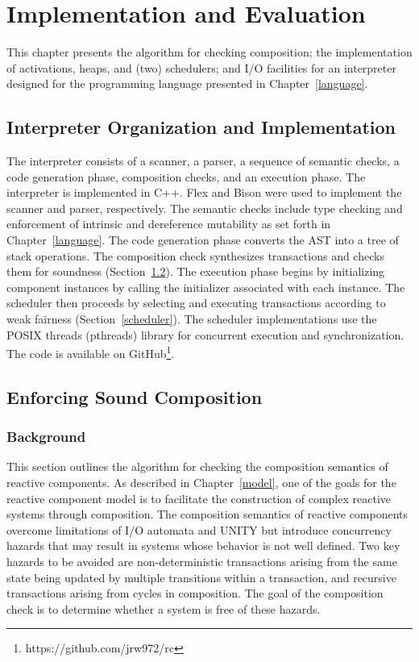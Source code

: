 \chapter{Implementation and Evaluation}
\label{implementation}

This chapter presents the algorithm for checking composition; the implementation of activations, heaps, and (two) schedulers; and I/O facilities for an interpreter designed for the \rcgo programming language presented in Chapter~\ref{language}.

\section{Interpreter Organization and Implementation}
\label{interpreter}

The interpreter consists of a scanner, a parser, a sequence of semantic checks, a code generation phase, composition checks, and an execution phase.
The interpreter is implemented in C++.
Flex and Bison were used to implement the scanner and parser, respectively.
The semantic checks include type checking and enforcement of intrinsic and dereference mutability as set forth in Chapter~\ref{language}.
The code generation phase converts the AST into a tree of stack operations.
The composition check synthesizes transactions and checks them for soundness (Section~\ref{sound_composition}).
The execution phase begins by initializing component instances by calling the initializer associated with each instance.
The scheduler then proceeds by selecting and executing transactions according to weak fairness (Section~\ref{scheduler}).
The scheduler implementations use the POSIX threads (pthreads) library for concurrent execution and synchronization.
The code is available on GitHub\footnote{https://github.com/jrw972/rc}.

\section{Enforcing Sound Composition}
\label{sound_composition}

\subsection{Background}

This section outlines the algorithm for checking the composition semantics of reactive components.
As described in Chapter~\ref{model}, one of the goals for the reactive component model is to facilitate the construction of complex reactive systems through composition.
The composition semantics of reactive components overcome limitations of I/O automata and UNITY but introduce concurrency hazards that may result in systems whose behavior is not well defined.
Two key hazards to be avoided are non-deterministic transactions arising from the same state being updated by multiple transitions within a transaction, and recursive transactions arising from cycles in composition.
The goal of the composition check is to determine whether a system is free of these hazards.

